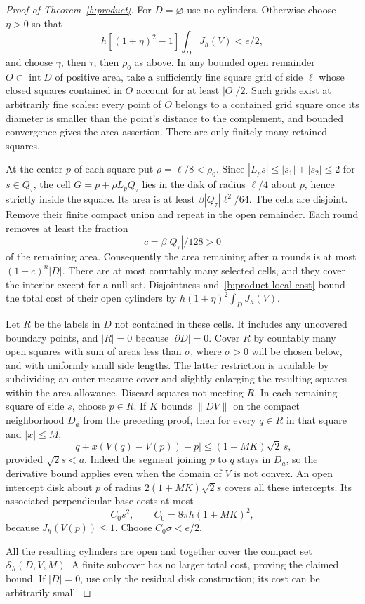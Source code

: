 \begin{proof}[Proof of Theorem~\ref{b:product}]
For $D=\varnothing$ use no cylinders.  Otherwise choose $\eta>0$ so
that
\[
 h[(1+\eta)^2-1]\int_D J_h(V)<e/2,
\]
and choose $\gamma$, then $\tau$, then $\rho_0$ as above.
In any bounded open remainder $O\subset\operatorname{int}D$ of
positive area, take a sufficiently fine square grid of side $\ell$
whose closed squares contained in $O$ account for at least $|O|/2$.
Such grids exist at arbitrarily fine scales: every point of $O$ belongs
to a contained grid square once its diameter is smaller than the
point's distance to the complement, and bounded convergence gives the
area assertion.  There are only finitely many retained squares.

At the center $p$ of each square put $\rho=\ell/8<\rho_0$.
Since $|L_ps|\le |s_1|+|s_2|\le2$ for $s\in Q_\tau$, the cell
$G=p+\rho L_pQ_\tau$ lies in the disk of radius $\ell/4$ about $p$,
hence strictly inside the square.  Its area is at least
$\beta|Q_\tau|\ell^2/64$.  The cells are disjoint.  Remove their
finite compact union and repeat in the open remainder.  Each round
removes at least the fraction
\[
 c=\beta|Q_\tau|/128>0
\]
of the remaining area.  Consequently the area remaining after $n$
rounds is at most $(1-c)^n|D|$.  There are at most countably many
selected cells, and they cover the interior except for a null set.
Disjointness and~\eqref{b:product-local-cost} bound the total cost of
their open cylinders by $h(1+\eta)^2\int_D J_h(V)$.

Let $R$ be the labels in $D$ not contained in these cells.
It includes any uncovered boundary points, and $|R|=0$ because
$|\partial D|=0$.  Cover $R$ by countably many open squares with
sum of areas less than $\sigma$, where $\sigma>0$ will be chosen
below, and with uniformly small side lengths.  The latter restriction
is available by subdividing an outer-measure cover and slightly
enlarging the resulting squares within the area allowance.
Discard squares not meeting $R$.  In each remaining square of side
$s$, choose $p\in R$.  If $K$ bounds $\|DV\|$ on the compact
neighborhood $D_a$ from the preceding proof, then for every $q\in R$
in that square and $|x|\le M$,
\[
 |q+x(V(q)-V(p))-p|\le(1+MK)\sqrt2\,s,
\]
provided $\sqrt2s<a$.  Indeed the segment joining $p$ to $q$
stays in $D_a$, so the derivative bound applies even when the domain
of $V$ is not convex.  An open intercept disk about $p$ of radius
$2(1+MK)\sqrt2s$ covers all these intercepts.  Its associated
perpendicular base costs at most
\[
 C_0s^2,\qquad C_0=8\pi h(1+MK)^2,
\]
because $J_h(V(p))\le1$.  Choose $C_0\sigma<e/2$.

All the resulting cylinders are open and together cover the compact
set $\mathcal S_h(D,V,M)$.  A finite subcover has no larger total
cost, proving the claimed bound.  If $|D|=0$, use only the residual
disk construction; its cost can be arbitrarily small.
\end{proof}


